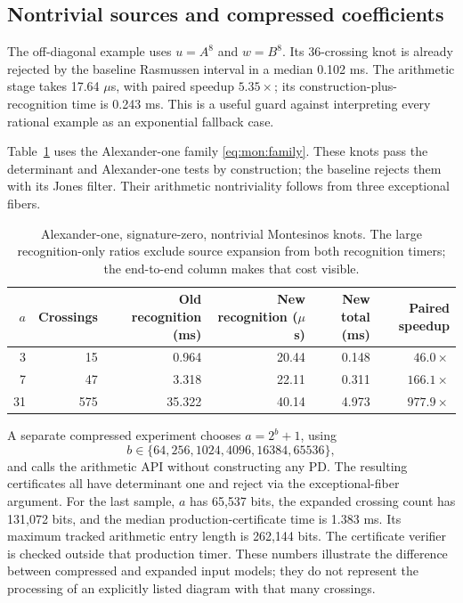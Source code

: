 \documentclass[11pt,a4paper]{article}
\theoremstyle{definition}
\theoremstyle{remark}
\numberwithin{equation}{section}
\begin{document}
\subsection{Nontrivial sources and compressed coefficients}

The off-diagonal example uses \(u=A^8\) and \(w=B^8\). Its 36-crossing
knot is already rejected by the baseline Rasmussen interval in a median
0.102 ms. The arithmetic stage takes 17.64 \(\mu\)s, with paired
speedup \(5.35\times\); its construction-plus-recognition time is
0.243 ms. This is a useful guard against interpreting every rational
example as an exponential fallback case.

Table~\ref{tab:pretzel-benchmarks} uses the Alexander-one family
\eqref{eq:mon:family}. These knots pass the determinant and Alexander-one
tests by construction; the baseline rejects them with its Jones filter.
Their arithmetic nontriviality follows from three exceptional fibers.

\begin{table}[htbp]
\centering\small
\begin{tabular}{rrrrrr}
\toprule
\(a\) & Crossings & Old recognition (ms) & New recognition (\(\mu\)s) &
New total (ms) & Paired speedup\\
\midrule
3 & 15 & 0.964 & 20.44 & 0.148 & \(46.0\times\)\\
7 & 47 & 3.318 & 22.11 & 0.311 & \(166.1\times\)\\
31 & 575 & 35.322 & 40.14 & 4.973 & \(977.9\times\)\\
\bottomrule
\end{tabular}
\caption{Alexander-one, signature-zero, nontrivial Montesinos knots.
The large recognition-only ratios exclude source expansion from both
recognition timers; the end-to-end column makes that cost visible.}
\label{tab:pretzel-benchmarks}
\end{table}

A separate compressed experiment chooses \(a=2^b+1\), using
\[b\in\{64,256,1024,4096,16384,65536\},\]
and calls the arithmetic API
without constructing any PD. The resulting certificates all have
determinant one and reject via the exceptional-fiber argument.
For the last sample, \(a\) has 65,537 bits, the expanded crossing count
has 131,072 bits, and the median production-certificate time is
1.383 ms. Its maximum tracked arithmetic entry length is 262,144 bits.
The certificate verifier is checked outside that production timer.
These numbers illustrate the difference between compressed and expanded
input models; they do not represent the processing of an explicitly
listed diagram with that many crossings.
\end{document}
